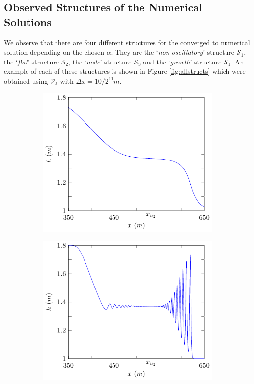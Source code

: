 \documentclass[times]{elsarticle}
\begin{document}
\subsection{Observed Structures of the Numerical Solutions}
\label{subsec:observedstructs}
We observe that there are four different structures for the converged to numerical solution depending on the chosen $\alpha$. They are the `\textit{non-oscillatory}' structure $\mathcal{S}_1$, the `\textit{flat}' structure $\mathcal{S}_2$, the `\textit{node}' structure $\mathcal{S}_3$ and the `\textit{growth}' structure $\mathcal{S}_4$. An example of each of these structures is shown in Figure \ref{fig:allstructs} which were obtained using $\mathcal{V}_3$ with $\Delta x = 10/2^{11}m$.

\begin{figure}
	\centering
	\begin{subfigure}{0.5\textwidth}
		\includegraphics[width=\textwidth]{Figure-4.pdf}
	\end{subfigure}%
	\begin{subfigure}{0.5\textwidth}
		\includegraphics[width=\textwidth]{Figure-5.pdf}

\end{subfigure}
\end{figure}
\end{document}
